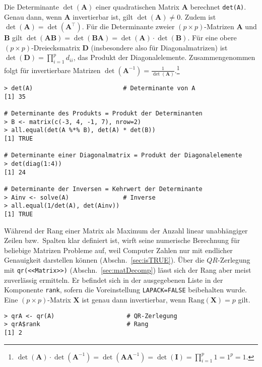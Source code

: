 Die Determinante $\det(\bm{A})$ einer quadratischen Matrix $\bm{A}$ berechnet \lstinline!det(A)!. Genau dann, wenn $\bm{A}$ invertierbar ist, gilt $\det(\bm{A}) \neq 0$. Zudem ist $\det(\bm{A}) = \det(\bm{A}^{\top})$. Für die Determinante zweier $(p \times p)$-Matrizen $\bm{A}$ und $\bm{B}$ gilt $\det(\bm{A} \bm{B}) = \det(\bm{B} \bm{A}) = \det(\bm{A}) \cdot \det(\bm{B})$. Für eine obere $(p \times p)$-Dreiecksmatrix $\bm{D}$ (insbesondere also für Diagonalmatrizen) ist $\det(\bm{D}) = \prod_{i=1}^{p} d_{ii}$, das Produkt der Diagonalelemente. Zusammengenommen folgt für invertierbare Matrizen $\det(\bm{A}^{-1}) = \frac{1}{\det(\bm{A})}$.\footnote{$\det(\bm{A}) \cdot \det(\bm{A}^{-1}) = \det(\bm{A} \bm{A}^{-1}) = \det(\bm{I}) = \prod_{i=1}^{p} 1 = 1^{p} = 1$.}
\begin{lstlisting}
> det(A)                         # Determinante von A
[1] 35

# Determinante des Produkts = Produkt der Determinanten
> B <- matrix(c(-3, 4, -1, 7), nrow=2)
> all.equal(det(A %*% B), det(A) * det(B))
[1] TRUE

# Determinante einer Diagonalmatrix = Produkt der Diagonalelemente
> det(diag(1:4))
[1] 24

# Determinante der Inversen = Kehrwert der Determinante
> Ainv <- solve(A)               # Inverse
> all.equal(1/det(A), det(Ainv))
[1] TRUE
\end{lstlisting}

Während der Rang einer Matrix als Maximum der Anzahl linear unabhängiger Zeilen bzw.\ Spalten klar definiert ist, wirft seine numerische Berechnung für beliebige Matrizen Probleme auf, weil Computer Zahlen nur mit endlicher Genauigkeit darstellen können (Abschn.\ \ref{sec:isTRUE}). Über die $QR$-Zerlegung mit \lstinline!qr(<<Matrix>>)! (Abschn.\ \ref{sec:matDecomp}) lässt sich der Rang aber meist zuverlässig ermitteln. Er befindet sich in der ausgegebenen Liste in der Komponente \lstinline!rank!, sofern die Voreinstellung \lstinline!LAPACK=FALSE! beibehalten wurde. Eine $(p \times p)$-Matrix $\bm{X}$ ist genau dann invertierbar, wenn $\text{Rang}(\bm{X}) = p$ gilt.
\begin{lstlisting}
> qrA <- qr(A)                    # QR-Zerlegung
> qrA$rank                        # Rang
[1] 2
\end{lstlisting}

